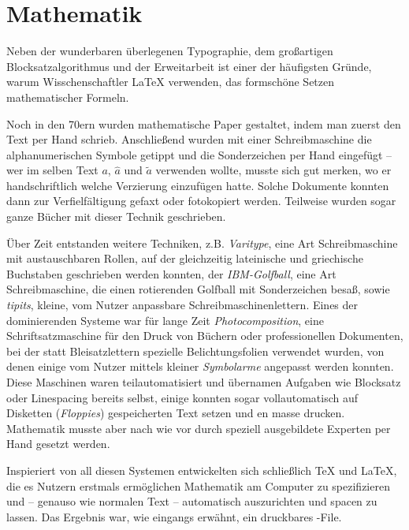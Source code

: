 \chapter{Mathematik}
Neben der wunderbaren überlegenen Typographie, dem großartigen Blocksatzalgorithmus und der Erweitarbeit ist einer der häufigsten Gründe, warum Wisschenschaftler \LaTeX{} verwenden, das formschöne Setzen mathematischer Formeln.

Noch in den 70ern wurden mathematische Paper gestaltet, indem man zuerst den Text per Hand schrieb.
Anschließend wurden mit einer Schreibmaschine die alphanumerischen Symbole getippt und die Sonderzeichen per Hand eingefügt -- wer im selben Text $a$, $\hat{a}$ und $\tilde{a}$ verwenden wollte, musste sich gut merken, wo er handschriftlich welche Verzierung einzufügen hatte.
Solche Dokumente konnten dann zur Verfielfältigung gefaxt oder fotokopiert werden.
Teilweise wurden sogar ganze Bücher mit dieser Technik geschrieben.

Über Zeit entstanden weitere Techniken, z.B. \emph{Varitype}, eine Art Schreibmaschine mit austauschbaren Rollen, auf der gleichzeitig lateinische und griechische Buchstaben geschrieben werden konnten, der \emph{IBM-Golfball}, eine Art Schreibmaschine, die einen rotierenden Golfball mit Sonderzeichen besaß, sowie \emph{tipits}, kleine, vom Nutzer anpassbare Schreibmaschinenlettern. 
Eines der dominierenden Systeme war für lange Zeit \emph{Photocomposition}, eine Schriftsatzmaschine für den Druck von Büchern oder professionellen Dokumenten, bei der statt Bleisatzlettern spezielle Belichtungsfolien verwendet wurden, von denen einige vom Nutzer mittels kleiner \emph{Symbolarme} angepasst werden konnten.
Diese Maschinen waren teilautomatisiert und übernamen Aufgaben wie Blocksatz oder Linespacing bereits selbst, einige konnten sogar vollautomatisch auf Disketten (\emph{Floppies}) gespeicherten Text setzen und en masse drucken.
Mathematik musste aber nach wie vor durch speziell ausgebildete Experten per Hand gesetzt werden.

Inspieriert von all diesen Systemen entwickelten sich schließlich \TeX{} und \LaTeX{}, die es Nutzern erstmals ermöglichen Mathematik am Computer zu spezifizieren und -- genauso wie normalen Text -- automatisch auszurichten und spacen zu lassen.
Das Ergebnis war, wie eingangs erwähnt, ein druckbares -File.

